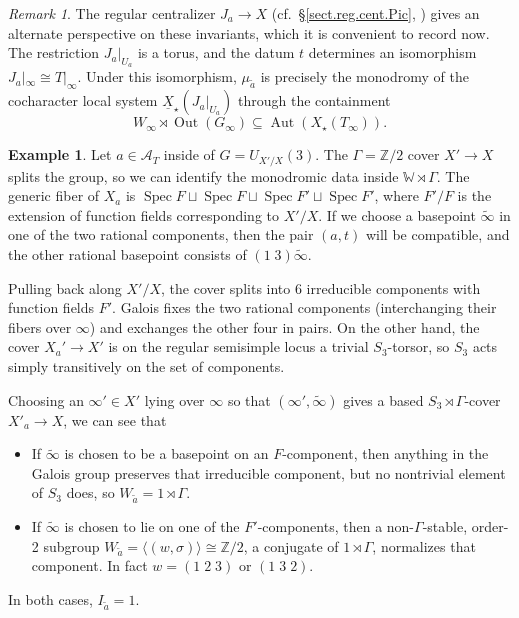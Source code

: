 \documentclass[openany]{amsbook}
\theoremstyle{definition}
\newtheorem{example}[theorem]{Example}
\theoremstyle{remark}
\newtheorem{remark}[theorem]{Remark}
\numberwithin{equation}{section}
\newcommand{\Z}{\mathbb{Z}}
\newcommand{\W}{\mathbb{W}}
\newcommand{\cA}{\mathcal{A}}
\newcommand{\ul}[1]{\underline{#1}}
\renewcommand{\-}{\operatorname{-}}
\newcommand{\Spec}{\operatorname{Spec}}
\newcommand{\Aut}{\operatorname{Aut}}
\newcommand{\Out}{\operatorname{Out}}
\newcommand{\wtilde}[1]{\widetilde{#1}}
\begin{document}
\begin{remark}\label{rmk.monodr.inv.reg.centr}
    The regular centralizer $J_a \to X$ (cf.\ \S \ref{sect.reg.cent.Pic}, \cite[\S 2]{ngofl}) gives an alternate perspective on these invariants, which it is convenient to record now. The restriction $J_a|_{U_a}$ is a torus, and the datum $t$ determines an isomorphism $J_a|_\infty \cong T|_\infty$. Under this isomorphism, $\mu_{\wtilde{a}}$ is precisely the monodromy of the cocharacter local system $\ul{X}_\star(J_a|_{U_a})$ through the containment
    $$
        W_\infty \rtimes \Out(G_\infty) \subseteq \Aut(X_\star(T_\infty)).
    $$
\end{remark}





\begin{example}
    Let $a \in \cA_{T}$ inside of $G = U_{X'/X}(3)$. The $\Gamma=\Z/2$ cover $X' \to X$ splits the group, so we can identify the monodromic data inside $\W \rtimes \Gamma$. The generic fiber of $X_a$ is $\Spec F \sqcup \Spec F \sqcup \Spec F' \sqcup \Spec F'$, where $F'/F$ is the extension of function fields corresponding to $X'/X$. If we choose a basepoint $\wtilde{\infty}$ in one of the two rational components, then the pair $(a,t)$ will be compatible, and the other rational basepoint consists of $(1 \; 3)\wtilde{\infty}$. 

    Pulling back along $X'/X$, the cover splits into 6 irreducible components with function fields $F'$. Galois fixes the two rational components (interchanging their fibers over $\infty$) and exchanges the other four in pairs. On the other hand, the cover $X_a' \to X'$ is on the regular semisimple locus a trivial $S_3$-torsor, so $S_3$ acts simply transitively on the set of components. 
    
    Choosing an $\infty' \in X'$ lying over $\infty$ so that $(\infty', \wtilde{\infty})$ gives a based $S_3 \rtimes \Gamma$-cover $X'_a \to X$, we can see that 
    \begin{itemize}
        \item If $\wtilde{\infty}$ is chosen to be a basepoint on an $F$-component, then anything in the Galois group preserves that irreducible component, but no nontrivial element of $S_3$ does, so $W_{\wtilde{a}} = 1 \rtimes \Gamma$.
        
        \item If $\wtilde{\infty}$ is chosen to lie on one of the $F'$-components, then a non-$\Gamma$-stable, order-2 subgroup $W_{\wtilde{a}} = \langle (w, \sigma)\rangle \cong \Z/2$, a conjugate of $1 \rtimes \Gamma$, normalizes that component. In fact $w = (1 \; 2 \; 3)$ or $(1 \; 3 \; 2)$.
    \end{itemize}
    In both cases, $I_{\wtilde{a}} = 1$. 
\end{example}
\end{document}
